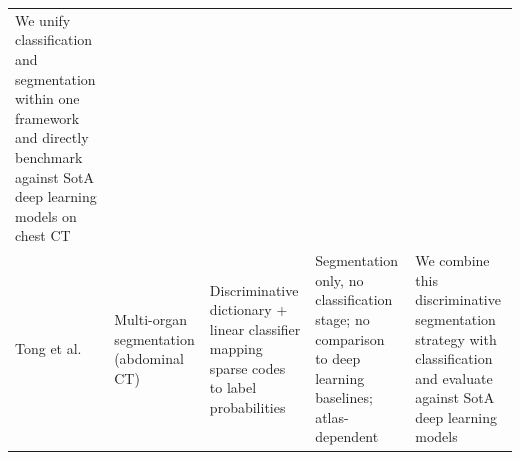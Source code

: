 \begin{table}[h]
{\begin{tabular}{p{2.2cm}p{2.5cm}p{4cm}p{4.5cm}p{4.5cm}}
We unify classification and segmentation within one framework and directly benchmark against SotA deep learning models on chest CT \\
\addlinespace
Tong et al. \cite{tong2015discriminative} &
Multi-organ segmentation (abdominal CT) &
Discriminative dictionary + linear classifier mapping sparse codes to label probabilities &
Segmentation only, no classification stage; no comparison to deep learning baselines; atlas-dependent &
We combine this discriminative segmentation strategy with classification and evaluate against SotA deep learning models \\
\bottomrule
\end{tabular}%
}
\end{table}
